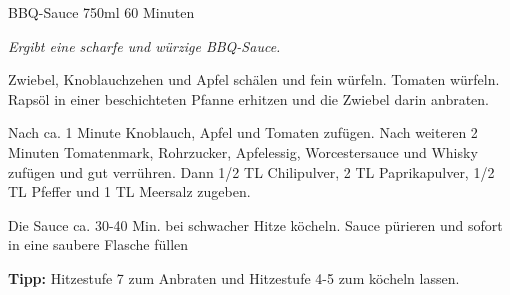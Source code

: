 \documentclass[
  DIV=11,%
  headinclude=true,
  footinclude=false,
  pagesize,%
  fontsize=11pt,%
  paper=a4,%
]{scrartcl}
\begin{document}
\begin{recipe}{BBQ-Sauce} {750ml} {60 Minuten}

\freeform
\textit{Ergibt eine scharfe und würzige BBQ-Sauce.}


Zwiebel, Knoblauchzehen und Apfel schälen und fein würfeln.
Tomaten würfeln.
Rapsöl in einer beschichteten Pfanne erhitzen und die Zwiebel darin anbraten.


Nach ca. 1 Minute Knoblauch, Apfel und Tomaten zufügen.
Nach weiteren 2 Minuten Tomatenmark, Rohrzucker, Apfelessig, Worcestersauce und Whisky zufügen und gut verrühren.
Dann 1/2 TL Chilipulver, 2 TL Paprikapulver, 1/2 TL Pfeffer und 1 TL Meersalz zugeben.

\newstep
Die Sauce ca. 30-40 Min. bei schwacher Hitze köcheln.
Sauce pürieren und sofort in eine saubere Flasche füllen

\freeform
\hrulefill

\freeform 
\textbf{Tipp:}
Hitzestufe 7 zum Anbraten und Hitzestufe 4-5 zum köcheln lassen.

\end{recipe}
\end{document}
